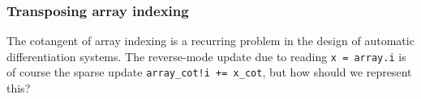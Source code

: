 \documentclass[acmsmall,screen,nonacm]{acmart}
\newlength{\codeindent}
\newcommand{\codelinesize}{\normalsize}
\begin{document}

\subsubsection{Transposing array indexing}
\label{sec:ad-of-indexing}
The cotangent of array indexing is a recurring problem in the design of automatic differentiation systems.
The reverse-mode update due to reading \texttt{x = array.i} is of course the sparse update \verb|array_cot!i += x_cot|, but how should we represent this?
\end{document}
